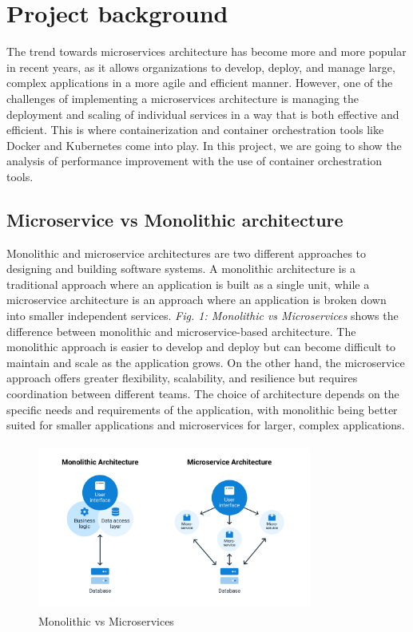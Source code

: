 \section{Project background}
The trend towards microservices architecture has become more and more popular in recent years, as it allows organizations to develop, deploy, and manage large, complex applications in a more agile and efficient manner. However, one of the challenges of implementing a microservices architecture is managing the deployment and scaling of individual services in a way that is both effective and efficient. This is where containerization and container orchestration tools like Docker and Kubernetes come into play. In this project, we are going to show the analysis of performance improvement with the use of container orchestration tools.

\subsection{ Microservice vs Monolithic architecture}
Monolithic and microservice architectures are two different approaches to designing and building software systems. A monolithic architecture is a traditional approach where an application is built as a single unit, while a microservice architecture is an approach where an application is broken down into smaller independent services. \emph{Fig. 1: Monolithic vs Microservices} shows the difference between monolithic and microservice-based architecture. The monolithic approach is easier to develop and deploy but can become difficult to maintain and scale as the application grows. On the other hand, the microservice approach offers greater flexibility, scalability, and resilience but requires coordination between different teams. The choice of architecture depends on the specific needs and requirements of the application, with monolithic being better suited for smaller applications and microservices for larger, complex applications.

\begin{figure}
\centering
\includegraphics[width=9cm, height=5.5cm]{monolith-vs-microservices}
\caption{Monolithic vs Microservices}
\end{figure}

